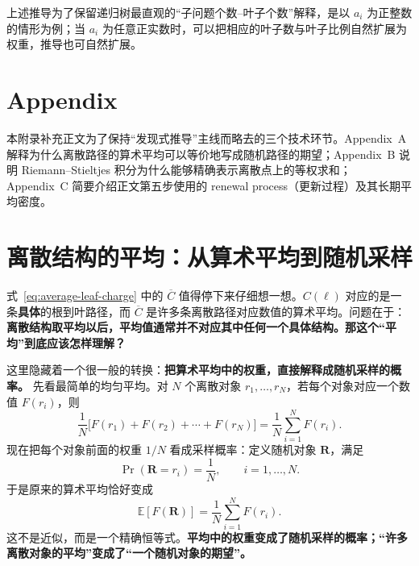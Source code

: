 \documentclass[11pt,a4paper]{article}
\begin{document}
上述推导为了保留递归树最直观的“子问题个数--叶子个数”解释，是以 $a_i$ 为正整数的情形为例；当 $a_i$ 为任意正实数时，可以把相应的叶子数与叶子比例自然扩展为权重，推导也可自然扩展。

\noindent
{}

\newpage
\section*{Appendix}
\appendix
本附录补充正文为了保持“发现式推导”主线而略去的三个技术环节。Appendix~A 解释为什么离散路径的算术平均可以等价地写成随机路径的期望；Appendix~B 说明 Riemann--Stieltjes 积分为什么能够精确表示离散点上的等权求和；Appendix~C 简要介绍正文第五步使用的 renewal process（更新过程）及其长期平均密度。

\section{离散结构的平均：从算术平均到随机采样}
式~\eqref{eq:average-leaf-charge} 中的 $\overline C$ 值得停下来仔细想一想。$C(\ell)$ 对应的是一条\textbf{具体}的根到叶路径，而 $\overline C$ 是许多条离散路径对应数值的算术平均。问题在于：\textbf{离散结构取平均以后，平均值通常并不对应其中任何一个具体结构。那这个“平均”到底应该怎样理解？}

这里隐藏着一个很一般的转换：\textbf{把算术平均中的权重，直接解释成随机采样的概率。} 先看最简单的均匀平均。对 $N$ 个离散对象 $r_1,\ldots,r_N$，若每个对象对应一个数值 $F(r_i)$，则
\begin{equation}
\frac{1}{N}\bigl[F(r_1)+F(r_2)+\cdots+F(r_N)\bigr]
=\frac{1}{N}\sum_{i=1}^{N}F(r_i).
\label{eq:discrete-average-general}
\end{equation}
现在把每个对象前面的权重 $1/N$ 看成采样概率：定义随机对象 $\mathbf R$，满足
\begin{equation}
\Pr(\mathbf R=r_i)=\frac{1}{N},
\qquad i=1,\ldots,N.
\label{eq:uniform-sampling-general}
\end{equation}
于是原来的算术平均恰好变成
\begin{equation}
\mathbb E[F(\mathbf R)]
=\frac{1}{N}\sum_{i=1}^{N}F(r_i).
\label{eq:average-as-expectation-general}
\end{equation}
这不是近似，而是一个精确恒等式。\textbf{平均中的权重变成了随机采样的概率；“许多离散对象的平均”变成了“一个随机对象的期望”。}
\end{document}
